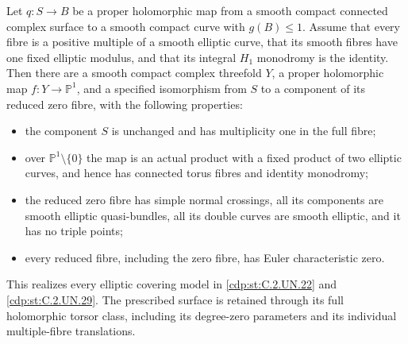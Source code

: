 \begin{proposition}\label{cdp:st:C.2.UN.34}

Let $q:S\to B$ be a proper holomorphic map from a
smooth compact connected complex surface to a smooth
compact curve with $g(B)\le1$. Assume that every
fibre is a positive multiple of a smooth elliptic
curve, that its smooth fibres have one fixed elliptic
modulus, and that its integral $H_1$ monodromy is
the identity. Then there are a smooth compact complex
threefold $Y$, a proper holomorphic map
$f:Y\to\mathbb P^1$, and a specified isomorphism
from $S$ to a component of its reduced zero fibre,
with the following properties:

\begin{itemize}
\item the component $S$ is unchanged and has
multiplicity one in the full fibre;
\item over $\mathbb P^1\setminus\{0\}$ the map
is an actual product with a fixed product of two
elliptic curves, and hence has connected torus
fibres and identity monodromy;
\item the reduced zero fibre has simple normal
crossings, all its components are smooth elliptic
quasi-bundles, all its double curves are smooth
elliptic, and it has no triple points;
\item every reduced fibre, including the zero
fibre, has Euler characteristic zero.
\end{itemize}
This realizes every elliptic covering model in
\ref{cdp:st:C.2.UN.22} and \ref{cdp:st:C.2.UN.29}. The prescribed surface
is retained through its full holomorphic torsor
class, including its degree-zero parameters and
its individual multiple-fibre translations.
\end{proposition}

